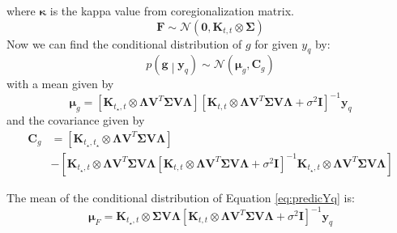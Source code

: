 where $\boldsymbol{\kappa}$ is the kappa value from coregionalization matrix.
\begin{equation} \label{eq:predictionF}
  \mathbf{F}  \sim \mathcal{N} \left( \mathbf{0},\mathbf{K}_{t,t} \otimes \boldsymbol{\Sigma}\right)
\end{equation}
Now we can find the conditional distribution of $g$ for given $y_q$ by:
\begin{equation}\label{eq:gGivenYq}
 p\left(\mathbf{g} \middle| \mathbf{y}_q\right) \sim 
    \mathcal{N} \left( \boldsymbol{\mu}_g, \mathbf{C}_g\right)
\end{equation}
with a mean given by
\begin{equation} \label{eq:prediction_MuG}
  \boldsymbol{\mu}_g = 
    \left[ \mathbf{K}_{t_\star,t} \otimes \boldsymbol{\Lambda} \mathbf{V}^T\boldsymbol{\Sigma} \mathbf{V} \boldsymbol{\Lambda}  \right] 
    \left[ \mathbf{K}_{t,t} \otimes \boldsymbol{\Lambda} \mathbf{V}^T\boldsymbol{\Sigma} \mathbf{V} \boldsymbol{\Lambda} + \sigma^2 \mathbf{I} \right]^{-1}\mathbf{y}_q
\end{equation}
and the covariance given by
\begin{equation} \label{eq:prediction_Cg}
\begin{split}
\boldsymbol{C}_g &= 
    \left[ \mathbf{K}_{t_\star,t_\star} \otimes \boldsymbol{\Lambda} \mathbf{V}^T\boldsymbol{\Sigma} \mathbf{V} \boldsymbol{\Lambda}  \right] \\
    & -\left[ \mathbf{K}_{t_\star,t} \otimes \boldsymbol{\Lambda} \mathbf{V}^T\boldsymbol{\Sigma} \mathbf{V} \boldsymbol{\Lambda}  
    \left[ \mathbf{K}_{t,t} \otimes \boldsymbol{\Lambda} \mathbf{V}^T\boldsymbol{\Sigma} \mathbf{V} \boldsymbol{\Lambda} + \sigma^2 \mathbf{I} \right]^{-1} 
    \mathbf{K}_{t_\star,t} \otimes \boldsymbol{\Lambda} \mathbf{V}^T\boldsymbol{\Sigma} \mathbf{V} \boldsymbol{\Lambda} \right]
\end{split}
\end{equation}

The mean of the conditional distribution of Equation \ref{eq:predicYq} %
is:
\begin{equation} \label{eq:prediction_MuF}
  \boldsymbol{\mu}_F = 
    \mathbf{K}_{t_\star,t} \otimes \boldsymbol{\Sigma} \mathbf{V} \boldsymbol{\Lambda}
    \left[ \mathbf{K}_{t,t} \otimes \boldsymbol{\Lambda} \mathbf{V}^T\boldsymbol{\Sigma} \mathbf{V} \boldsymbol{\Lambda} + \sigma^2 \mathbf{I} \right]^{-1}\mathbf{y}_q
\end{equation}

